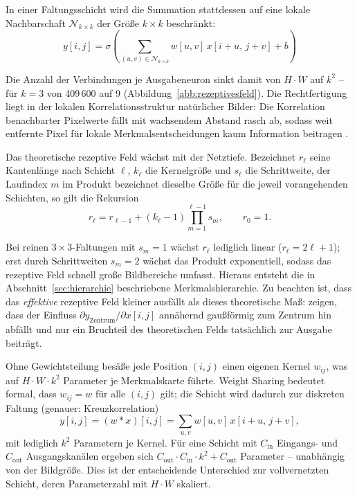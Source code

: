 In einer Faltungsschicht wird die Summation stattdessen auf eine lokale
Nachbarschaft $\mathcal{N}_{k \times k}$ der Größe $k \times k$ beschränkt:
\begin{equation}
y[i,j] = \sigma\!\left(\sum_{(u,v)\in\mathcal{N}_{k\times k}} w[u,v]\,
x[i+u,\,j+v] + b\right)
\label{eq:conv}
\end{equation}

Die Anzahl der Verbindungen je Ausgabeneuron sinkt damit von $H \cdot W$ auf
$k^2$ -- für $k = 3$ von 409\,600 auf 9 (Abbildung~\ref{abb:rezeptivesfeld}).
Die Rechtfertigung liegt in der lokalen Korrelationsstruktur natürlicher Bilder:
Die Korrelation benachbarter Pixelwerte fällt mit wachsendem Abstand rasch
ab, sodass weit entfernte Pixel für lokale Merkmalsentscheidungen kaum
Information beitragen \parencite{lecun1998}.

Das theoretische rezeptive Feld wächst mit der Netztiefe. Bezeichnet $r_\ell$
seine Kantenlänge nach Schicht $\ell$, $k_\ell$ die Kernelgröße und $s_\ell$ die
Schrittweite, der Laufindex $m$ im Produkt bezeichnet dieselbe Größe für die jeweil
 vorangehenden Schichten, so gilt die Rekursion
\begin{equation}
r_\ell = r_{\ell-1} + (k_\ell - 1)\prod_{m=1}^{\ell-1} s_m,
\qquad r_0 = 1.
\label{eq:rf}
\end{equation}

Bei reinen $3\times3$-Faltungen mit $s_m = 1$ wächst $r_\ell$ lediglich linear
($r_\ell = 2\ell + 1$); erst durch Schrittweiten $s_m = 2$ wächst das Produkt
exponentiell, sodass das rezeptive Feld schnell große Bildbereiche umfasst.
Hieraus entsteht die in Abschnitt~\ref{sec:hierarchie} beschriebene
Merkmalshierarchie. Zu beachten ist, dass das \emph{effektive} rezeptive Feld
kleiner ausfällt als dieses theoretische Maß:
\textcite{luo2016} zeigen, dass der Einfluss
$\partial y_{\text{Zentrum}} / \partial x[i,j]$ annähernd gaußförmig zum Zentrum
hin abfällt und nur ein Bruchteil des theoretischen Felds tatsächlich zur
Ausgabe beiträgt.

 Ohne Gewichtsteilung besäße jede
Position $(i,j)$ einen eigenen Kernel $w_{ij}$, was auf $H \cdot W \cdot k^2$
Parameter je Merkmalskarte führte. Weight Sharing bedeutet formal, dass
$w_{ij} = w$ für alle $(i,j)$ gilt; die Schicht wird dadurch zur diskreten
Faltung (genauer: Kreuzkorrelation)
\begin{equation}
y[i,j] = (w * x)[i,j] = \sum_{u,v} w[u,v]\,x[i+u,\,j+v],
\end{equation}
mit lediglich $k^2$ Parametern je Kernel. Für eine Schicht mit $C_{\text{in}}$
Eingangs- und $C_{\text{out}}$ Ausgangskanälen ergeben sich
$C_{\text{out}} \cdot C_{\text{in}} \cdot k^2 + C_{\text{out}}$ Parameter --
unabhängig von der Bildgröße. Dies ist der entscheidende Unterschied zur
vollvernetzten Schicht, deren Parameterzahl mit $H \cdot W$ skaliert.

